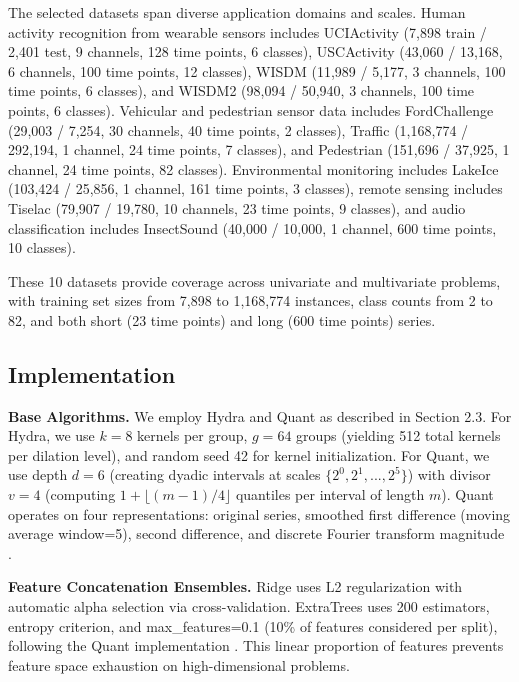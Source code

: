 \documentclass[pdflatex,sn-basic]{sn-jnl}           %
\theoremstyle{thmstyleone}%
\theoremstyle{thmstyletwo}%
\theoremstyle{thmstylethree}%
\begin{document}
The selected datasets span diverse application domains and scales. Human activity recognition from wearable sensors includes UCIActivity (7,898 train / 2,401 test, 9 channels, 128 time points, 6 classes), USCActivity (43,060 / 13,168, 6 channels, 100 time points, 12 classes), WISDM (11,989 / 5,177, 3 channels, 100 time points, 6 classes), and WISDM2 (98,094 / 50,940, 3 channels, 100 time points, 6 classes). Vehicular and pedestrian sensor data includes FordChallenge (29,003 / 7,254, 30 channels, 40 time points, 2 classes), Traffic (1,168,774 / 292,194, 1 channel, 24 time points, 7 classes), and Pedestrian (151,696 / 37,925, 1 channel, 24 time points, 82 classes). Environmental monitoring includes LakeIce (103,424 / 25,856, 1 channel, 161 time points, 3 classes), remote sensing includes Tiselac (79,907 / 19,780, 10 channels, 23 time points, 9 classes), and audio classification includes InsectSound (40,000 / 10,000, 1 channel, 600 time points, 10 classes).

These 10 datasets provide coverage across univariate and multivariate problems, with training set sizes from 7,898 to 1,168,774 instances, class counts from 2 to 82, and both short (23 time points) and long (600 time points) series.

\subsection{Implementation}\label{subsec:implementation}

\textbf{Base Algorithms.} We employ Hydra and Quant as described in Section 2.3. For Hydra, we use $k=8$ kernels per group, $g=64$ groups (yielding 512 total kernels per dilation level), and random seed 42 for kernel initialization. For Quant, we use depth $d=6$ (creating dyadic intervals at scales $\{2^0, 2^1, ..., 2^5\}$) with divisor $v=4$ (computing $1 + \lfloor (m-1)/4 \rfloor$ quantiles per interval of length $m$). Quant operates on four representations: original series, smoothed first difference (moving average window=5), second difference, and discrete Fourier transform magnitude \citep{quant}.

\textbf{Feature Concatenation Ensembles.} Ridge uses L2 regularization with automatic alpha selection via cross-validation. ExtraTrees uses 200 estimators, entropy criterion, and max\_features=0.1 (10\% of features considered per split), following the Quant implementation \citep{quant}. This linear proportion of features prevents feature space exhaustion on high-dimensional problems.
\end{document}
